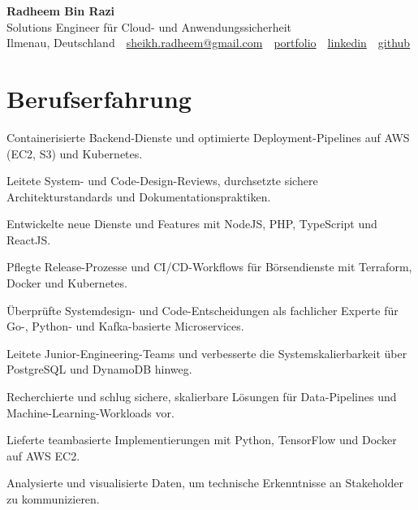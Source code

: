 \documentclass[11pt,a4paper]{resume}
\makeatletter
\newcommand{\Portfolio}{https://radheem.github.io/my-cv}
\newcommand{\PortfolioText}{portfolio}
\newcommand{\GitHub}{https://github.com/radheem}
\newcommand{\LinkedIn}{https://www.linkedin.com/in/radheem-razi}
\newcommand{\Email}{sheikh.radheem@gmail.com}
\makeatother
\begin{document}
\clearpage
{}

\begin{center}
  {\huge\bfseries Radheem Bin Razi}\\[3pt]
  {\large Solutions Engineer für Cloud- und Anwendungssicherheit}\\[6pt]
  \small
  Ilmenau, Deutschland \,\textbar\,
  \href{mailto:\Email}{\Email} \,\textbar\,
  \href{\Portfolio}{\PortfolioText} \,\textbar\,
  \href{\LinkedIn}{linkedin} \,\textbar\,
  \href{\GitHub}{github}
\end{center}
\vspace{2pt}

\section{Berufserfahrung}

\bullets
  \item Containerisierte Backend-Dienste und optimierte Deployment-Pipelines auf AWS (EC2, S3) und Kubernetes.
  \item Leitete System- und Code-Design-Reviews, durchsetzte sichere Architekturstandards und Dokumentationspraktiken.
  \item Entwickelte neue Dienste und Features mit NodeJS, PHP, TypeScript und ReactJS.
\bulletsend
\vspace{3pt}
\bullets
  \item Pflegte Release-Prozesse und CI/CD-Workflows für Börsendienste mit Terraform, Docker und Kubernetes.
  \item Überprüfte Systemdesign- und Code-Entscheidungen als fachlicher Experte für Go-, Python- und Kafka-basierte Microservices.
  \item Leitete Junior-Engineering-Teams und verbesserte die Systemskalierbarkeit über PostgreSQL und DynamoDB hinweg.
\bulletsend
\vspace{3pt}
\bullets
  \item Recherchierte und schlug sichere, skalierbare Lösungen für Data-Pipelines und Machine-Learning-Workloads vor.
  \item Lieferte teambasierte Implementierungen mit Python, TensorFlow und Docker auf AWS EC2.
  \item Analysierte und visualisierte Daten, um technische Erkenntnisse an Stakeholder zu kommunizieren.
\bulletsend
\vspace{3pt}
\end{document}
